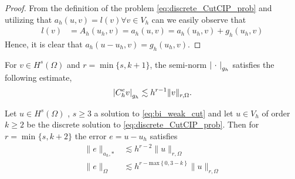 \begin{proof}
   From the definition of the problem \eqref{eq:discrete_CutCIP_prob} and utilizing that $a_{h}( u,v) = l(v ) \forall v \in V_{h} $ can we easily observe that \[
       \begin{split}
   l(v ) & =  A_{h}( u_{h},v) =  a_{h}( u,v)  = a_{h}( u_{h},v)+g_{h}( u_{h},v)
       \end{split}
   \]
    Hence, it is clear that $a_{h}( u -  u_{h}, v) = g_{h}( u_{h},v)  $.
\end{proof}

\begin{assumption}[EP2]
    \label{as:bi_EP2}
    For $v \in H^{s}( \Omega ) $ and $r = \min \{s,k+1 \} $, the semi-norm $\left\lvert  \ \cdot \   \right\rvert_{g_{h}} $ satisfies the following estimate, \[
    \left\lvert  C _{h}^{e} v  \right\rvert _{g_{h}} \lesssim  h^{r-1} \| v \|_{ r,\Omega  }^{  }.
    \]
\end{assumption}


\begin{theorem}
    \label{thm:apriori_result}
    Let $u \in H^{s}( \Omega ) $ , $s\ge 3$ a solution to \eqref{eq:bi_weak_cut} and let $u \in V_{h}$ of order $k\ge 2$ be the discrete solution to \eqref{eq:discrete_CutCIP_prob}. Then for $r = \min_{}\{s, k+2\} $ the error $e = u - u_{h}$ satisfies
    \begin{align}
        \label{eq:bi_apriori_1}
            \| e \|_{ a_{h},* }^{  } &\lesssim   h^{r-2} \| u \|_{ r,\Omega  }^{  }\\
        \label{eq:bi_apriori_2}
        \| e \|_{ \Omega  }^{  } &\lesssim   h^{r-\mathrm{max}\left\{ 0, 3-k \right\} } \| u \|_{ r,\Omega  }^{  }
    \end{align}

\end{theorem}

